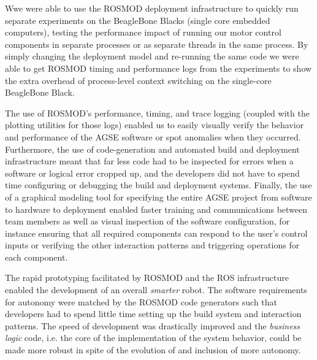 Wwe were able to use the ROSMOD deployment infrastructure to
quickly run separate experiments on the BeagleBone Blacks (single core
embedded computers), testing the performance impact of running our
motor control components in separate processes or as separate threads
in the same process.  By simply changing the deployment model and
re-running the same code we were able to get ROSMOD timing and
performance logs from the experiments to show the extra overhead of
process-level context switching on the single-core BeagleBone Black.

The use of ROSMOD's performance, timing, and trace logging (coupled
with the plotting utilities for those logs) enabled us to easily
visually verify the behavior and performance of the AGSE software or
spot anomalies when they occurred.  Furthermore, the use of
code-generation and automated build and deployment infrastructure
meant that far less code had to be inspected for errors when a
software or logical error cropped up, and the developers did not have
to spend time configuring or debugging the build and deployment
systems.  Finally, the use of a graphical modeling tool for specifying
the entire AGSE project from software to hardware to deployment
enabled faster training and communications between team members as
well as visual inspection of the software configuration, for instance
ensuring that all required components can respond to the user's
control inputs or verifying the other interaction patterns and
triggering operations for each component.

The rapid prototyping facilitated by ROSMOD and the ROS infrastructure
enabled the development of an overall \emph{smarter} robot. The
software requirements for autonomy were matched by the ROSMOD code
generators such that developers had to spend little time setting up
the build system and interaction patterns. The speed of development
was drastically improved and the \emph{business logic} code, i.e. the
core of the implementation of the system behavior, could be made more
robust in spite of the evolution of and inclusion of more autonomy.


